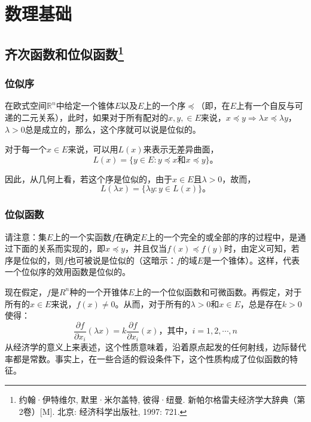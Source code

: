 \chapter{数理基础}
\label{chp:mathematics-for-economics}

\section[齐次函数和位似函数]{齐次函数和位似函数\footnote{约翰·伊特维尔, 默里·米尔盖特, 彼得·纽曼. 新帕尔格雷夫经济学大辞典（第2卷）[M]. 北京: 经济科学出版社, 1997: 721.}}

\subsection{位似序}

在欧式空间$\mathbb{R}^n$中给定一个锥体$E$以及$E$上的一个序$\preccurlyeq$（即，在$E$上有一个自反与可递的二元关系），此时，如果对于所有配对的$x,y, \in E$来说，$x \preccurlyeq y \Rightarrow \lambda x \preccurlyeq \lambda y$，$\lambda > 0$总是成立的，那么，这个序就可以说是位似的。

对于每一个$x \in E$来说，可以用$L(x)$来表示无差异曲面，
\[L(x) = \{y \in E : y \preccurlyeq x \text{和} x \preccurlyeq y\} \text{。}\]

因此，从几何上看，若这个序是位似的，由于$x \in E$且$\lambda > 0$，故而，
\[L(\lambda x) = \{\lambda y : y \in L(x)\} \text{。}\]

\subsection{位似函数}

请注意：集$E$上的一个实函数$f$在确定$E$上的一个完全的或全部的序的过程中，是通过下面的关系而实现的，即$x \preccurlyeq y$，并且仅当$f(x) \preccurlyeq f(y)$时，由定义可知，若序是位似的，则$f$也可被说是位似的（这暗示：$f$的域$E$是一个锥体）。这样，代表一个位似序的效用函数是位似的。

现在假定，$f$是$R^n$种的一个开锥体$E$上的一个位似函数和可微函数。再假定，对于所有的$x \in E$来说，$f(x) \ne 0$。从而，对于所有的$\lambda > 0$和$x \in E$，总是存在$k > 0$使得：
\begin{equation}
\frac{{\partial f}}{{\partial {x_i}}}(\lambda x) = k\frac{{\partial f}}{{\partial {x_i}}}(x) \text{，其中，} i = 1, 2, \cdots ,  n
\end{equation}
从经济学的意义上来表述，这个性质意味着，沿着原点起发的任何射线，边际替代率都是常数。事实上，在一些合适的假设条件下，这个性质构成了位似函数的特征。

